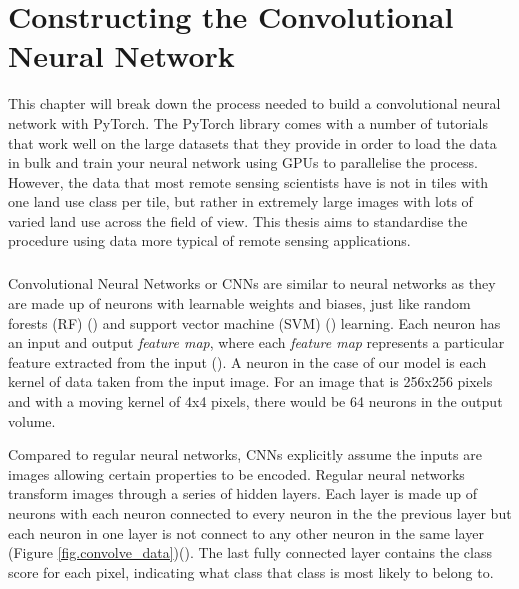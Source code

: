 \chapter{Constructing the Convolutional Neural Network }
This chapter will break down the process needed to build a convolutional neural network with PyTorch. The PyTorch library comes with a number of tutorials that work well on the large datasets that they provide in order to load the data in bulk and train your neural network using GPUs to parallelise the process. However, the data that most remote sensing scientists have is not in tiles with one land use class per tile, but rather in extremely large images with lots of varied land use across the field of view. This thesis aims to standardise the procedure using data more typical of remote sensing applications.
\paragraph{}
Convolutional Neural Networks or CNNs are similar to neural networks as they are made up of neurons with learnable weights and biases, just like random forests (RF) (\cite{belgiu16,Breiman01}) and support vector machine (SVM) (\cite{cortes95,mountrakis11,vapnik82}) learning. Each neuron has an input and output \textit{feature map}, where each \textit{feature map} represents a particular feature extracted from the input (\cite{lecun10}). A neuron in the case of our model is each kernel of data taken from the input image. For an image that is 256x256 pixels and with a moving kernel of 4x4 pixels, there would be 64 neurons in the output volume. 
\par 
Compared to regular neural networks, CNNs explicitly assume the inputs are images allowing certain properties to be encoded. Regular neural networks transform images through a series of hidden layers. Each layer is made up of neurons with each neuron connected to every neuron in the the previous layer but each neuron in one layer is not connect to any other neuron in the same layer (Figure \ref{fig.convolve_data})(\cite{karpathy_cnn1}). The last fully connected layer contains the class score for each pixel, indicating what class that class is most likely to belong to. 
\par 
